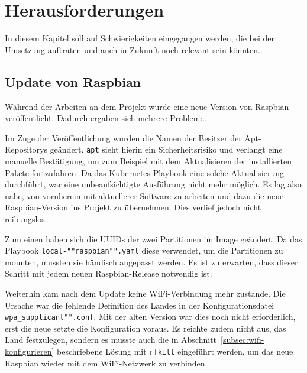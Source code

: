 \section{Herausforderungen}

In diesem Kapitel soll auf Schwierigkeiten eingegangen werden, die bei der Umsetzung auftraten und auch in Zukunft noch relevant sein könnten.

\subsection{Update von Raspbian}

Während der Arbeiten an dem Projekt wurde eine neue Version von Raspbian veröffentlicht.
Dadurch ergaben sich mehrere Probleme.

Im Zuge der Veröffentlichung wurden die Namen der Besitzer der Apt-Repositorys geändert.
\texttt{apt} sieht hierin ein Sicherheitsrisiko und verlangt eine manuelle Bestätigung, um zum Beispiel mit dem Aktualisieren der installierten Pakete fortzufahren.
Da das Kubernetes-Playbook eine solche Aktualisierung durchführt, war eine unbeaufsichtigte Ausführung nicht mehr möglich.
Es lag also nahe, von vornherein mit aktuellerer Software zu arbeiten und dazu die neue Raspbian-Version ins Projekt zu übernehmen.
Dies verlief jedoch nicht reibungslos.

Zum einen haben sich die UUIDs der zwei Partitionen im Image geändert.
Da das Playbook \texttt{local-""raspbian"".yaml} diese verwendet, um die Partitionen zu mounten, mussten sie händisch angepasst werden.
Es ist zu erwarten, dass dieser Schritt mit jedem neuen Raspbian-Release notwendig ist.

Weiterhin kam nach dem Update keine WiFi-Verbindung mehr zustande.
Die Ursache war die fehlende Definition des Landes in der Konfigurationsdatei \texttt{wpa\_supplicant"".conf}.
Mit der alten Version war dies noch nicht erforderlich, erst die neue setzte die Konfiguration voraus.
Es reichte zudem nicht aus, das Land festzulegen, sondern es musste auch die in Abschnitt~\ref{subsec:wifi-konfigurieren} beschriebene Lösung mit \texttt{rfkill} eingeführt werden, um das neue Raspbian wieder mit dem WiFi-Netzwerk zu verbinden.
